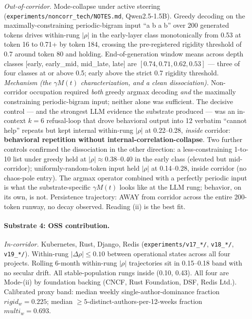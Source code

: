 \documentclass[11pt,a4paper]{article}
\begin{document}
\emph{Out-of-corridor.} Mode-collapse under active steering (\texttt{experiments/noncorr\_tech/NOTES.md}, Qwen2.5-1.5B). Greedy decoding on the maximally-constraining periodic-bigram input ``a b a b'' over 200 generated tokens drives within-rung $|\rho|$ in the early-layer class monotonically from 0.53 at token 16 to 0.71+ by token 184, crossing the pre-registered rigidity threshold of 0.7 around token 80 and holding. End-of-generation window means across depth classes $[$early, early\_mid, mid\_late, late$]$ are $[0.74, 0.71, 0.62, 0.53]$ --- three of four classes at or above 0.5; early above the strict 0.7 rigidity threshold. \emph{Mechanism (the $\gamma M(t)$ characterization, and a clean dissociation).} Non-corridor occupation required \emph{both} greedy argmax decoding \emph{and} the maximally constraining periodic-bigram input; neither alone was sufficient. The decisive control --- and the strongest LLM evidence the substrate produced --- was an in-context $k=6$ refusal-loop that drove behavioral output into 12 verbatim ``cannot help'' repeats but kept internal within-rung $|\rho|$ at 0.22--0.28, \emph{inside} corridor: \textbf{behavioral repetition without internal-correlation-collapse}. Two further controls confirmed the dissociation in the other direction: a less-constraining 1-to-10 list under greedy held at $|\rho| \approx 0.38$--$0.40$ in the early class (elevated but mid-corridor); uniformly-random-token input held $|\rho|$ at 0.14--0.28, inside corridor (no chaos-pole entry). The argmax operator combined with a perfectly periodic input is what the substrate-specific $\gamma M(t)$ looks like at the LLM rung; behavior, on its own, is not. Persistence trajectory: AWAY from corridor across the entire 200-token runway, no decay observed. Reading (ii) is the best fit.

\paragraph{Substrate 4: OSS contribution.}

\emph{In-corridor.} Kubernetes, Rust, Django, Redis (\texttt{experiments/v17\_*/}, \texttt{v18\_*/}, \texttt{v19\_*/}). Within-rung $|\Delta\rho| \le 0.10$ between operational states across all four projects. Rolling 6-month within-rung $|\rho|$ trajectories sit in 0.15--0.18 band with no secular drift. All stable-population rungs inside (0.10, 0.43). All four are Mode-(ii) by foundation backing (CNCF, Rust Foundation, DSF, Redis Ltd.). Calibrated proxy band: median weekly single-author-dominance fraction $rigid_w = 0.225$; median $\ge 5$-distinct-authors-per-12-weeks fraction $multi_w = 0.693$.
\end{document}
